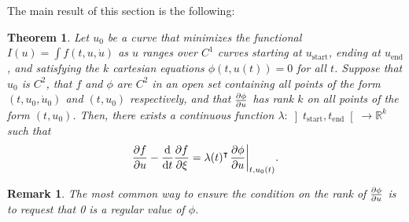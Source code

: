 \documentclass{article}
\newtheorem{theorem}{Theorem}
\theoremstyle{plain}
\newtheorem{remark}{Remark}
\theoremstyle{nonumberplain}
\newcommand{\R}{\mathbb{R}}
\newcommand{\tr}{\intercal}
\newcommand{\tstart}{\mathrm{start}}
\newcommand{\tend}{\mathrm{end}}
\DeclarePairedDelimiter\eval{.}{\rvert}
\begin{document}
The main result of this section is the following:

\begin{theorem}\label{lagrangeholonomic}
Let $u_0$ be a curve that minimizes the functional $I(u) = \int f(t,u,\dot u)$ as $u$ ranges over $C^1$ curves starting at $u_\tstart$, ending at $u_\tend$, and satisfying the $k$ cartesian equations $\phi(t,u(t)) = 0$ for all $t$. Suppose that $u_0$ is $C^2$, that $f$ and $\phi$ are $C^2$ in an open set containing all points of the form $(t,u_0,\dot u_0)$ and $(t,u_0)$ respectively, and that $\diffp \phi u$ has rank $k$ on all points of the form $(t,u_0)$. Then, there exists a continuous function $\lambda \colon \left]t_\tstart, t_\tend\right[ \to \R^k$ such that
\begin{equation}\label{eq:lagrangeholonomic}
\diffp f u - \diff*{\diffp f \xi}t = \lambda(t)^\tr \eval*{\diffp{\phi}{u}}_{t,u_0(t)}.
\end{equation}
\end{theorem}

\begin{remark}
The most common way to ensure the condition on the rank of $\diffp \phi u$ is to request that 0 is a regular value of $\phi$.
\end{remark}
\end{document}
